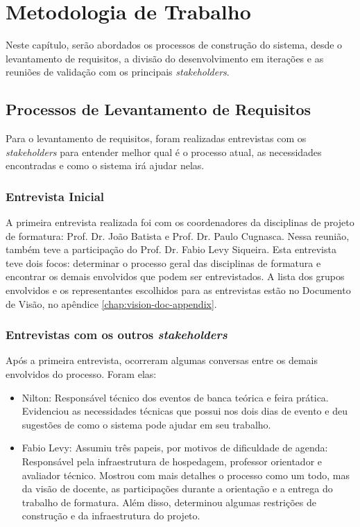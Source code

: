 \chapter{Metodologia de Trabalho}\label{chap:metodologia-trabalho}
Neste capítulo, serão abordados os processos de construção do sistema, desde o levantamento de requisitos, a divisão do desenvolvimento em iterações e as reuniões de validação com os principais \textit{stakeholders}.

\section{Processos de Levantamento de Requisitos}
Para o levantamento de requisitos, foram realizadas entrevistas com os \textit{stakeholders} para entender melhor qual é o processo atual, as necessidades encontradas e como o sistema irá ajudar nelas.

\subsection{Entrevista Inicial}
A primeira entrevista realizada foi com os coordenadores da disciplinas de projeto de formatura: Prof. Dr. João Batista e Prof. Dr. Paulo Cugnasca. Nessa reunião, também teve a participação do Prof. Dr. Fabio Levy Siqueira. Esta entrevista teve dois focos: determinar o processo geral das disciplinas de formatura e encontrar os demais envolvidos que podem ser entrevistados. A lista dos grupos envolvidos e os representantes escolhidos para as entrevistas estão no Documento de Visão, no apêndice \ref{chap:vision-doc-appendix}.

\subsection{Entrevistas com os outros \textit{stakeholders}}
Após a primeira entrevista, ocorreram algumas conversas entre os demais envolvidos do processo. Foram elas:

\begin{itemize}
    \item Nilton: Responsável técnico dos eventos de banca teórica e feira prática. Evidenciou as necessidades técnicas que possui nos dois dias de evento e deu sugestões de como o sistema pode ajudar em seu trabalho.
    \item Fabio Levy: Assumiu três papeis, por motivos de dificuldade de agenda: Responsável pela infraestrutura de hospedagem, professor orientador e avaliador técnico. Mostrou com mais detalhes o processo como um todo, mas da visão de docente, as participações durante a orientação e a entrega do trabalho de formatura. Além disso, determinou algumas restrições de construção e da infraestrutura do projeto.
\end{itemize}

